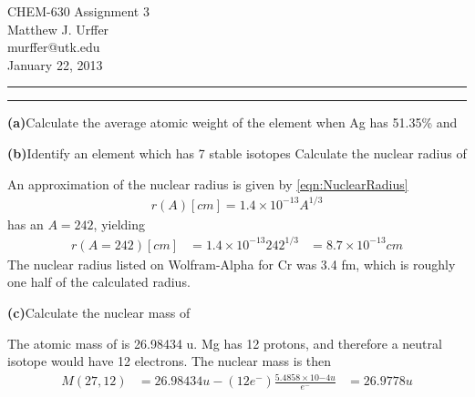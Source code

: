 \documentclass[11pt]{article}
\makeatletter
\newcommand{\question}[2] {\vspace{.25in} \hrule\vspace{0.5em}
\noindent{\bf #1: #2} \vspace{0.5em}
\hrule \vspace{.10in}}
\renewcommand{\part}[1] {\vspace{.10in} {\bf (#1)}}
\newcommand{\myname}{Matthew J. Urffer}
\newcommand{\myemail}{murffer@utk.edu}
\newcommand{\myhwnum}{3}
\makeatother
\begin{document}
\medskip                        %

\thispagestyle{plain}
\begin{center}                  %
{\Large CHEM-630 Assignment \myhwnum} \\
\myname \\
\myemail \\
January 22, 2013 \\
\end{center}

\question{1.11}{Atoms}

\part{a}{Calculate the average atomic weight of the element when Ag has 51.35\%  and }


\part{b}{Identify an element which has 7 stable isotopes}
{Calculate the nuclear radius of }

An approximation of the nuclear radius is given by \ref{eqn:NuclearRadius}
\begin{align}
	r(A)[cm] = 1.4\times10^{-13}A^{1/3} 
	\label{eqn:NuclearRadius}
\end{align}
 has an $A=242$, yielding
\begin{align}
	r(A=242)[cm] &= 1.4\times10^{-13}242^{1/3} 
					 &= 8.7\times10^{-13} cm 
\end{align}
The nuclear radius listed on Wolfram-Alpha for Cr was 3.4 fm, which is roughly one half of the calculated radius.

\part{c}{Calculate the nuclear mass of }

The atomic mass of  is 26.98434 u. Mg has 12 protons, and therefore a neutral isotope would have 12 electrons.
The nuclear mass is then
\begin{align}
	M(27,12) &= 26.98434 u - (12e^-)\frac{5.4858\times10{-4} u}{e^-}
				&= 26.9778 u
\end{align}
\end{document}

